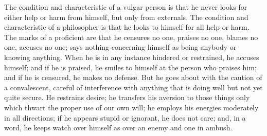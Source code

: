 The condition and characteristic of a vulgar person is that he never
looks for either help or harm from himself, but only from externals. The
condition and characteristic of a philosopher is that he looks to himself
for all help or harm. The marks of a proficient are that he censures no
one, praises no one, blames no one, accuses no one; says nothing
concerning himself as being anybody or knowing anything. When he is in
any instance hindered or restrained, he accuses himself; and if he is
praised, he smiles to himself at the person who praises him; and if he is
censured, he makes no defense. But he goes about with the caution of a
convalescent, careful of interference with anything that is doing well
but not yet quite secure. He restrains desire; he transfers his aversion
to those things only which thwart the proper use of our own will; he
employs his energies moderately in all directions; if he appears stupid
or ignorant, he does not care; and, in a word, he keeps watch over
himself as over an enemy and one in ambush.
